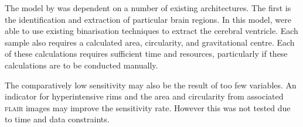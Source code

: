 The model by \cite{Yokoyama2007} was dependent on a number of existing architectures. The first is the identification and extraction of particular brain regions. In this model, \cite{Yokoyama2007} were able to use existing binarisation techniques to extract the cerebral ventricle. Each sample also requires a calculated area, circularity, and gravitational centre. Each of these calculations requires sufficient time and resources, particularly if these calculations are to be conducted manually.

The comparatively low sensitivity may also be the result of too few variables. An indicator for hyperintensive rims and the area and circularity from associated \textsc{flair} images may improve the sensitivity rate. However this was not tested due to time and data constraints.

%
%
%
%
%
%
